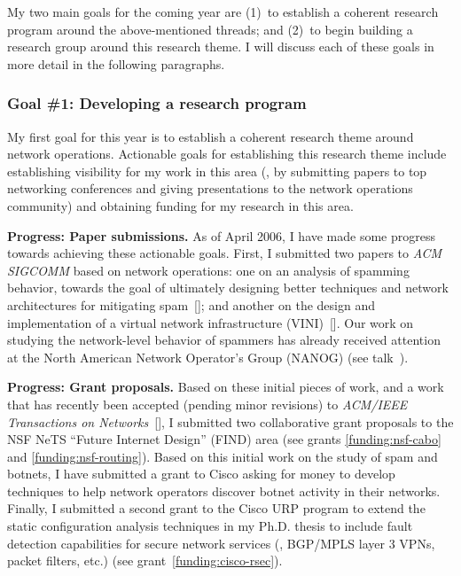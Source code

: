 My two main goals for the coming year are (1)~to establish a coherent
research program around the above-mentioned threads; and (2)~to begin
building a research group around this research theme.  I will discuss
each of these goals in more detail in the following paragraphs.

\subsubsection*{Goal \#1: Developing a research program}

My first goal for this year is to establish a coherent research theme
around network operations.  Actionable goals for establishing this
research theme include establishing visibility for my work in this area
(\ie, by submitting papers to top networking conferences and giving
presentations to the network operations community) and obtaining funding
for my research in this area.

{\bf Progress: Paper submissions.}  As of April 2006, I have made some
progress towards achieving these actionable goals.  First, I submitted
two papers to {\em ACM SIGCOMM} based on network operations: one on an
analysis of spamming behavior, towards the goal of ultimately designing
better techniques and network architectures for mitigating
spam~[]; and another on the design and
implementation of a virtual network infrastructure
(VINI)~[].  Our work on studying the network-level
behavior of spammers has already received attention at the North
American Network Operator's Group (NANOG) (see
talk~).

{\bf Progress: Grant proposals.}  Based on these initial pieces of work,
and a work that has recently been accepted (pending minor revisions) to
{\em ACM/IEEE Transactions on Networks}~[],
I submitted two collaborative grant proposals to the NSF NeTS ``Future
Internet Design'' (FIND) area (see grants \ref{funding:nsf-cabo} and
\ref{funding:nsf-routing}).  Based on this initial work on the study of
spam and botnets, I have submitted a grant to Cisco asking for money to
develop techniques to help network operators discover botnet activity in
their networks.  Finally, I submitted a second grant to the Cisco URP
program to extend the static configuration analysis techniques in my
Ph.D. thesis to include fault detection capabilities for secure network
services (\eg, BGP/MPLS layer 3 VPNs, packet filters, etc.) (see
grant~\ref{funding:cisco-rsec}).

